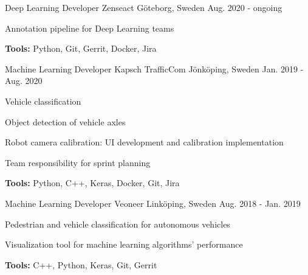 

\begin{cventries}

  \cventry
    {Deep Learning Developer} %
    {Zenseact} %
    {Göteborg, Sweden} %
    {Aug. 2020 - ongoing} %
    {
      \begin{cvitems} %
        \item {Annotation pipeline for Deep Learning teams}
        \item {\textbf{Tools:} Python, Git, Gerrit, Docker, Jira}
      \end{cvitems}
    }

  \cventry
    {Machine Learning Developer} %
    {Kapsch TrafficCom} %
    {Jönköping, Sweden} %
    {Jan. 2019 - Aug. 2020} %
    {
      \begin{cvitems} %
        \item {Vehicle classification}
        \item {Object detection of vehicle axles}
        \item {Robot camera calibration: UI development and calibration implementation}
        \item {Team responsibility for sprint planning}
        \item {\textbf{Tools:} Python, C++, Keras, Docker, Git, Jira}
      \end{cvitems}
    }

  \cventry
    {Machine Learning Developer} %
    {Veoneer} %
    {Linköping, Sweden} %
    {Aug. 2018 - Jan. 2019} %
    {
      \begin{cvitems} %
        \item {Pedestrian and vehicle classification for autonomous vehicles}
        \item {Visualization tool for machine learning algorithms' performance}
        \item {\textbf{Tools:} C++, Python, Keras, Git, Gerrit}
      \end{cvitems}
    }


\end{cventries}
